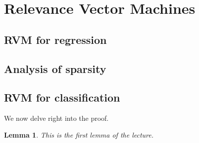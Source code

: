 \documentclass[twoside]{article}
\newtheorem{lemma}[theorem]{Lemma}
\begin{document}
\section{Relevance Vector Machines} 

\subsection{RVM for regression}

\subsection{Analysis of sparsity}

\subsection{RVM for classification}


























We now delve right into the proof.

\begin{lemma}
This is the first lemma of the lecture.
\end{lemma}
\end{document}
